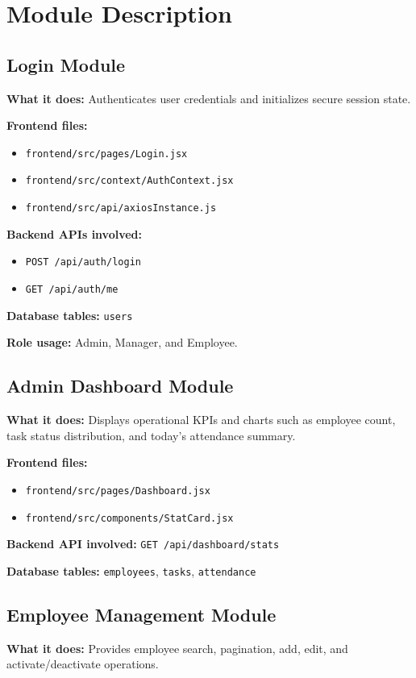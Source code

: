 \chapter{Module Description}

\section{Login Module}
\textbf{What it does:} Authenticates user credentials and initializes secure session state.

\textbf{Frontend files:}
\begin{itemize}[leftmargin=1.3cm]
\item \texttt{frontend/src/pages/Login.jsx}
\item \texttt{frontend/src/context/AuthContext.jsx}
\item \texttt{frontend/src/api/axiosInstance.js}
\end{itemize}

\textbf{Backend APIs involved:}
\begin{itemize}[leftmargin=1.3cm]
\item \texttt{POST /api/auth/login}
\item \texttt{GET /api/auth/me}
\end{itemize}

\textbf{Database tables:} \texttt{users}

\textbf{Role usage:} Admin, Manager, and Employee.

\section{Admin Dashboard Module}
\textbf{What it does:} Displays operational KPIs and charts such as employee count, task status distribution, and today's attendance summary.

\textbf{Frontend files:}
\begin{itemize}[leftmargin=1.3cm]
\item \texttt{frontend/src/pages/Dashboard.jsx}
\item \texttt{frontend/src/components/StatCard.jsx}
\end{itemize}

\textbf{Backend API involved:} \texttt{GET /api/dashboard/stats}

\textbf{Database tables:} \texttt{employees}, \texttt{tasks}, \texttt{attendance}

\section{Employee Management Module}
\textbf{What it does:} Provides employee search, pagination, add, edit, and activate/deactivate operations.

